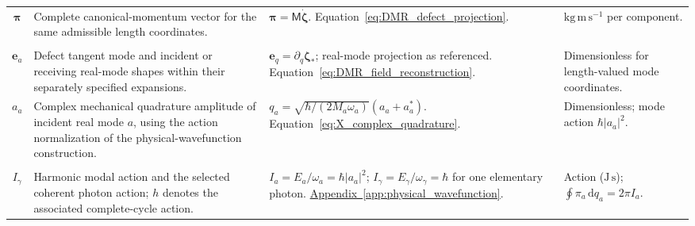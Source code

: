 \begin{longtable}{@{} c p{5.5cm} p{4cm} p{3.5cm} @{}}
$\boldsymbol\pi$ & {\raggedright Complete canonical-momentum vector for the same admissible length coordinates.\par} & {\raggedright $\boldsymbol\pi=\mathsf M\dot{\boldsymbol\zeta}$. \newline Equation~\eqref{eq:DMR_defect_projection}.\par} & {\raggedright $\mathrm{kg\,m\,s^{-1}}$ per component.\par} \\

\begin{tabular}[c]{@{}c@{}}$\mathbf e_q$ \\ $\mathbf e_a$\end{tabular} & {\raggedright Defect tangent mode and incident or receiving real-mode shapes within their separately specified expansions.\par} & {\raggedright $\mathbf e_q=\partial_q\boldsymbol\zeta_*$; real-mode projection as referenced. \newline Equation~\eqref{eq:DMR_field_reconstruction}.\par} & {\raggedright Dimensionless for length-valued mode coordinates.\par} \\

$a_a$ & {\raggedright Complex mechanical quadrature amplitude of incident real mode $a$, using the action normalization of the physical-wavefunction construction.\par} & {\raggedright $q_a=\sqrt{\hbar/(2M_a\omega_a)}(a_a+a_a^*)$. \newline Equation~\eqref{eq:X_complex_quadrature}.\par} & {\raggedright Dimensionless; mode action $\hbar|a_a|^2$.\par} \\

\begin{tabular}[c]{@{}c@{}}$I_a$ \\ $I_\gamma$\end{tabular} & {\raggedright Harmonic modal action and the selected coherent photon action; $h$ denotes the associated complete-cycle action.\par} & {\raggedright $I_a=E_a/\omega_a=\hbar|a_a|^2$; $I_\gamma=E_\gamma/\omega_\gamma=\hbar$ for one elementary photon. \newline \hyperref[app:physical_wavefunction]{Appendix~\ref*{app:physical_wavefunction}}.\par} & {\raggedright Action ($\mathrm{J\,s}$); $\oint\pi_a\,\mathrm dq_a=2\pi I_a$.\par} \\


\end{longtable}
